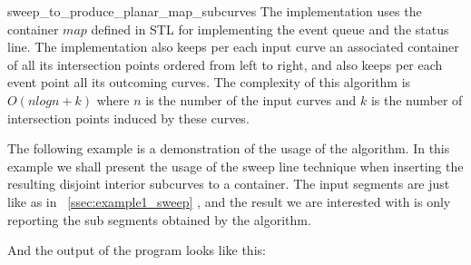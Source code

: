 \begin{ccRefFunction}{sweep_to_produce_planar_map_subcurves}
\ccImplementation 
The implementation uses the container $map$ defined in STL for implementing 
the event queue and the status line.
The implementation also keeps per each input curve an associated container of all 
its intersection points ordered from left to right, and also keeps per each event point all 
its outcoming curves.   
The complexity of this algorithm is $O(nlogn + k)$ where $n$ is the number of the input curves 
and $k$ is the number of intersection points induced by these curves.


\label{ssec:example3_sweep}
The following example is a demonstration of the usage of the  algorithm. 
In this example we shall present the usage of the sweep line technique 
when inserting the resulting disjoint interior subcurves to a container. 
The input segments are just like as in ~\ref{ssec:example1_sweep} , 
and the result we are interested with is only reporting the sub segments 
obtained by the  algorithm.


And the output of the program looks like this:


\end{ccRefFunction} %

\ccRefPageEnd











